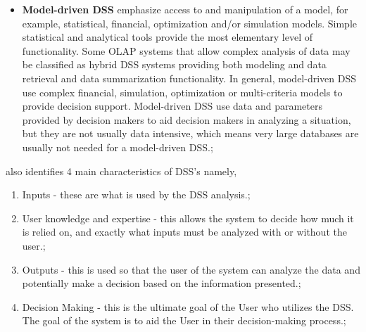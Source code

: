 \begin {itemize}
\item \textbf{Model-driven DSS} emphasize access to and manipulation of a model, for example, statistical, financial, optimization and/or simulation models. Simple statistical and analytical tools provide the most elementary level of functionality. Some OLAP systems that allow complex analysis of data may be classified as hybrid DSS systems providing both modeling and data retrieval and data summarization functionality. In general, model-driven DSS use complex financial, simulation, optimization or multi-criteria models to provide decision support. Model-driven DSS use data and parameters provided by decision makers to aid decision makers in analyzing a situation, but they are not usually data intensive, which means very large databases are usually not needed for a model-driven DSS.;
\end {itemize}

\cite{Power2003} also identifies 4 main characteristics of DSS's namely,

\begin {enumerate}
\item Inputs - these are what is used by the DSS analysis.;
\item User knowledge and expertise - this allows the system to decide how much it is relied on, and exactly what inputs must be analyzed with or without the user.;
\item Outputs - this is used so that the user of the system can analyze the data and potentially make a decision based on the information presented.;
\item Decision Making - this is the ultimate goal of the User who utilizes the DSS. The goal of the system is to aid the User in their decision-making process.;
\end {enumerate}